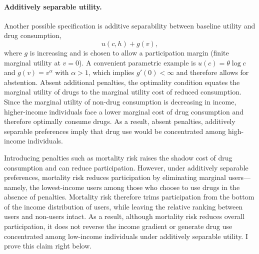 \paragraph{Additively separable utility.}
Another possible specification is additive separability between baseline utility and drug consumption,
\[
u(c,h)+g(v),
\]
where $g$ is increasing and is chosen to allow a participation margin (finite marginal utility at $v=0$).
A convenient parametric example is $u(c)=\theta\log c$ and $g(v)=v^{\alpha}$ with $\alpha>1$, which implies
$g'(0)<\infty$ and therefore allows for abstention. Absent additional penalties, the optimality condition equates the marginal utility of drugs to the marginal utility cost of reduced consumption. Since the marginal utility of non-drug consumption is decreasing in income, higher-income individuals face a lower marginal cost of drug consumption and therefore optimally consume drugs. As a result, absent penalties, additively separable preferences imply that drug use would be concentrated among high-income individuals.

Introducing penalties such as mortality risk raises the shadow cost of drug consumption and can reduce participation. However, under additively separable preferences, mortality risk reduces participation by eliminating marginal users—namely, the lowest-income users among those who choose to use drugs in the absence of penalties. Mortality risk therefore trims participation from the bottom of the income distribution of users, while leaving the relative ranking between users and non-users intact. As a result, although mortality risk reduces overall participation, it does not reverse the income gradient or generate drug use concentrated among low-income individuals under additively separable utility. I prove this claim right below.

